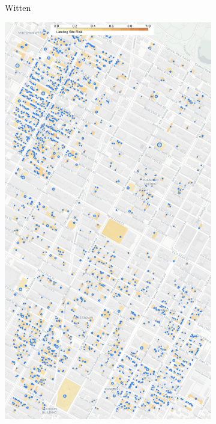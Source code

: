 \begin{figure}[!t]
\begin{minipage}[b]{0.50\textwidth}
\begin{subfigure}[b]{\linewidth}
     \caption{Witten}\label{fig:ch5_wt_all_risk}
   \end{subfigure}
 \end{minipage}
 \hfill
 \begin{subfigure}[b]{0.44\textwidth}
 \centering
 \includegraphics[clip, trim=0.0cm 0.0cm 0.0cm 0.0cm, width=\linewidth]{chapter_5_mapping/imgs/newyork_all_ls_risk.jpg}

\end{subfigure}
\end{figure}
